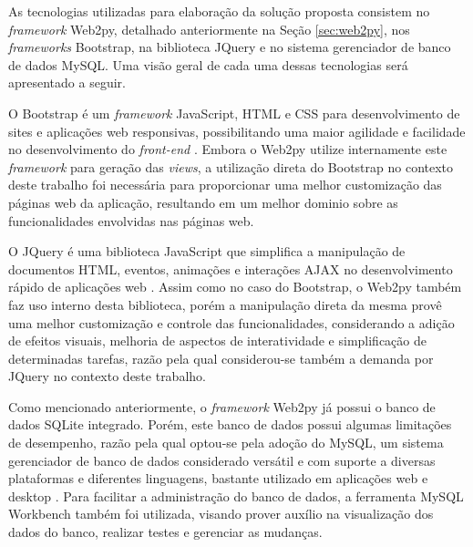 As tecnologias utilizadas para elaboração da solução proposta consistem no \emph{framework} Web2py, detalhado anteriormente na Seção \ref{sec:web2py}, nos \emph{frameworks} Bootstrap, na biblioteca JQuery e no sistema gerenciador de banco de dados MySQL. Uma visão geral de cada uma dessas tecnologias será apresentado a seguir.

O Bootstrap é um \emph{framework} JavaScript, HTML e CSS para desenvolvimento de sites e aplicações web responsivas, possibilitando uma maior agilidade e facilidade no desenvolvimento do \emph{front-end} \cite{Silva:Livro}. Embora o Web2py utilize internamente este \emph{framework} para geração das \emph{views}, a utilização direta do Bootstrap no contexto deste trabalho foi necessária para proporcionar uma melhor customização das páginas web da  aplicação, resultando em um melhor dominio sobre as funcionalidades envolvidas nas páginas web.

O JQuery é uma biblioteca JavaScript que simplifica a manipulação de documentos HTML, eventos, animações e interações AJAX no desenvolvimento rápido de aplicações web \cite{Duckett:JS}. Assim como no caso do Bootstrap, o Web2py também faz uso interno desta biblioteca, porém a manipulação direta da mesma provê  uma melhor customização e controle das funcionalidades, considerando a adição de efeitos visuais, melhoria de aspectos de interatividade e simplificação de determinadas tarefas, razão pela qual considerou-se também a demanda por JQuery no contexto deste trabalho.

Como mencionado anteriormente, o \emph{framework} Web2py já possui o banco de dados SQLite integrado. Porém, este banco de dados possui algumas limitações de desempenho, razão pela qual optou-se pela adoção do MySQL, um sistema gerenciador de banco de dados considerado versátil e com suporte a diversas plataformas e diferentes linguagens, bastante utilizado em aplicações web e desktop \cite{MySql:MySql}. Para facilitar a administração do banco de dados, a ferramenta MySQL Workbench \cite{MySql:WorkBench} também foi utilizada, visando prover auxílio na visualização dos dados do banco, realizar testes e gerenciar as mudanças.
